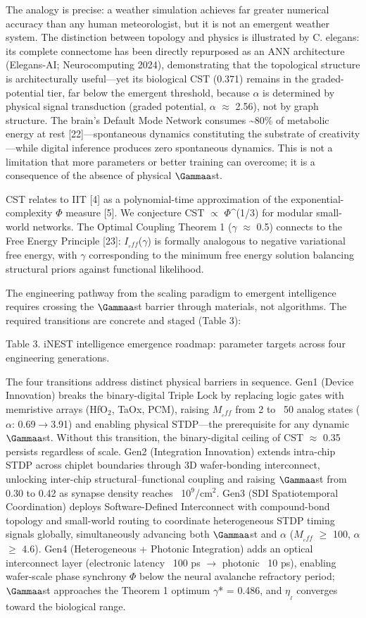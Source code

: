 \documentclass[a4paper,12pt]{article}
\begin{document}
The analogy is precise: a weather simulation achieves far greater numerical accuracy than any human meteorologist, but it is not an emergent weather system. The distinction between topology and physics is illustrated by C. elegans: its complete connectome has been directly repurposed as an ANN architecture (Elegans-AI; Neurocomputing 2024), demonstrating that the topological structure is architecturally useful---yet its biological CST (0.371) remains in the graded-potential tier, far below the emergent threshold, because $\alpha$ is determined by physical signal transduction (graded potential, $\alpha$ $\approx$ 2.56), not by graph structure. The brain's Default Mode Network consumes \textasciitilde{}80\% of metabolic energy at rest [22]---spontaneous dynamics constituting the substrate of creativity---while digital inference produces zero spontaneous dynamics. This is not a limitation that more parameters or better training can overcome; it is a consequence of the absence of physical $\Gammaa$st.


CST relates to IIT [4] as a polynomial-time approximation of the exponential-complexity $\Phi$ measure [5]. We conjecture CST $\propto$ $\Phi$^(1/3) for modular small-world networks. The Optimal Coupling Theorem 1 ($\gamma$ $\approx$ 0.5) connects to the Free Energy Principle [23]: $I_{_eff}$($\gamma$) is formally analogous to negative variational free energy, with $\gamma$ corresponding to the minimum free energy solution balancing structural priors against functional likelihood.


The engineering pathway from the scaling paradigm to emergent intelligence requires crossing the $\Gammaa$st barrier through materials, not algorithms. The required transitions are concrete and staged (Table 3):


Table 3. iNEST intelligence emergence roadmap: parameter targets across four engineering generations.


The four transitions address distinct physical barriers in sequence. Gen1 (Device Innovation) breaks the binary-digital Triple Lock by replacing logic gates with memristive arrays (HfO$_2$, TaOx, PCM), raising $M_{_eff}$ from 2 to ~50 analog states ($\alpha$: 0.69$\rightarrow$3.91) and enabling physical STDP---the prerequisite for any dynamic $\Gammaa$st. Without this transition, the binary-digital ceiling of CST $\approx$ 0.35 persists regardless of scale. Gen2 (Integration Innovation) extends intra-chip STDP across chiplet boundaries through 3D wafer-bonding interconnect, unlocking inter-chip structural--functional coupling and raising $\Gammaa$st from 0.30 to 0.42 as synapse density reaches ~10$^9$/cm$^2$. Gen3 (SDI Spatiotemporal Coordination) deploys Software-Defined Interconnect with compound-bond topology and small-world routing to coordinate heterogeneous STDP timing signals globally, simultaneously advancing both $\Gammaa$st and $\alpha$ ($M_{_eff}$ $\geq$ 100, $\alpha$ $\geq$ 4.6). Gen4 (Heterogeneous + Photonic Integration) adds an optical interconnect layer (electronic latency ~100 ps $\rightarrow$ photonic ~10 ps), enabling wafer-scale phase synchrony $\Phi$ below the neural avalanche refractory period; $\Gammaa$st approaches the Theorem 1 optimum $\gamma$* = 0.486, and $\eta_{_I}$ converges toward the biological range.
\end{document}
